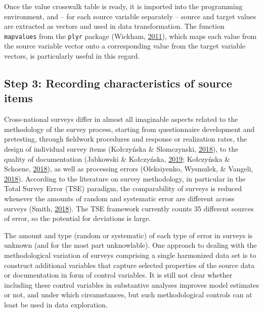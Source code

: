 \documentclass[12pt,]{article}
\begin{document}
Once the value crosswalk table is ready, it is imported into the programming environment, and -- for each source variable separately -- source and target values are extracted as vectors and used in data transformation. The function \texttt{mapvalues} from the \texttt{plyr} package (Wickham, \protect\hyperlink{ref-Wickham2011}{2011}), which maps each value from the source variable vector onto a corresponding value from the target variable vectors, is particularly useful in this regard.

\hypertarget{step-3-recording-characteristics-of-source-items}{%
\subsection{Step 3: Recording characteristics of source items}\label{step-3-recording-characteristics-of-source-items}}

Cross-national surveys differ in almost all imaginable aspects related to the methodology of the survey process, starting from questionnaire development and pretesting, through fieldwork procedures and response or realization rates, the design of individual survey items (Kołczyńska \& Slomczynski, \protect\hyperlink{ref-KolczynskaSlomczynski2018}{2018}), to the quality of documentation (Jabkowski \& Kołczyńska, \protect\hyperlink{ref-Jabkowski2019}{2019}; Kołczyńska \& Schoene, \protect\hyperlink{ref-KolczynskaSchoene2018}{2018}), as well as processing errors (Oleksiyenko, Wysmulek, \& Vangeli, \protect\hyperlink{ref-Oleksiyenko2018}{2018}). According to the literature on survey methodology, in particular in the Total Survey Error (TSE) paradigm, the comparability of surveys is reduced whenever the amounts of random and systematic error are different across surveys (Smith, \protect\hyperlink{ref-Smith2018}{2018}). The TSE framework currently counts 35 different sources of error, so the potential for deviations is large.

The amount and type (random or systematic) of each type of error in surveys is unknown (and for the most part unknowlable). One approach to dealing with the methodological variation of surveys comprising a single harmonized data set is to construct additional variables that capture selected properties of the source data or documentation in form of control variables. It is still not clear whether including these control variables in substantive analyses improves model estimates or not, and under which cirsumstances, but such methodological controls can at least be used in data exploration.
\end{document}
